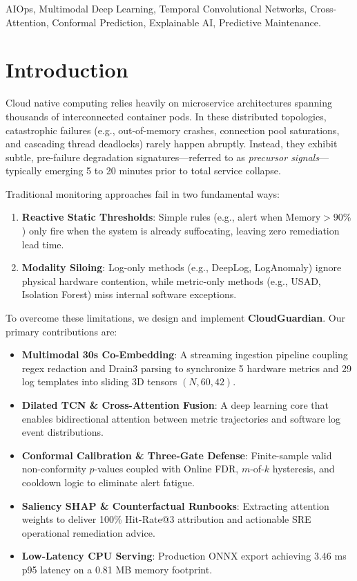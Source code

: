\documentclass[conference]{IEEEtran}
\begin{document}
\begin{IEEEkeywords}
AIOps, Multimodal Deep Learning, Temporal Convolutional Networks, Cross-Attention, Conformal Prediction, Explainable AI, Predictive Maintenance.
\end{IEEEkeywords}

\section{Introduction}
Cloud native computing relies heavily on microservice architectures spanning thousands of interconnected container pods. In these distributed topologies, catastrophic failures (e.g., out-of-memory crashes, connection pool saturations, and cascading thread deadlocks) rarely happen abruptly. Instead, they exhibit subtle, pre-failure degradation signatures—referred to as \textit{precursor signals}—typically emerging 5 to 20 minutes prior to total service collapse.

Traditional monitoring approaches fail in two fundamental ways:
\begin{enumerate}
    \item \textbf{Reactive Static Thresholds}: Simple rules (e.g., alert when $\text{Memory} > 90\%$) only fire when the system is already suffocating, leaving zero remediation lead time.
    \item \textbf{Modality Siloing}: Log-only methods (e.g., DeepLog, LogAnomaly) ignore physical hardware contention, while metric-only methods (e.g., USAD, Isolation Forest) miss internal software exceptions.
\end{enumerate}

To overcome these limitations, we design and implement \textbf{CloudGuardian}. Our primary contributions are:
\begin{itemize}
    \item \textbf{Multimodal 30s Co-Embedding}: A streaming ingestion pipeline coupling regex redaction and Drain3 parsing to synchronize 5 hardware metrics and 29 log templates into sliding 3D tensors $(N, 60, 42)$.
    \item \textbf{Dilated TCN \& Cross-Attention Fusion}: A deep learning core that enables bidirectional attention between metric trajectories and software log event distributions.
    \item \textbf{Conformal Calibration \& Three-Gate Defense}: Finite-sample valid non-conformity $p$-values coupled with Online FDR, $m$-of-$k$ hysteresis, and cooldown logic to eliminate alert fatigue.
    \item \textbf{Saliency SHAP \& Counterfactual Runbooks}: Extracting attention weights to deliver 100\% Hit-Rate@3 attribution and actionable SRE operational remediation advice.
    \item \textbf{Low-Latency CPU Serving}: Production ONNX export achieving 3.46 ms p95 latency on a 0.81 MB memory footprint.
\end{itemize}
\end{document}
